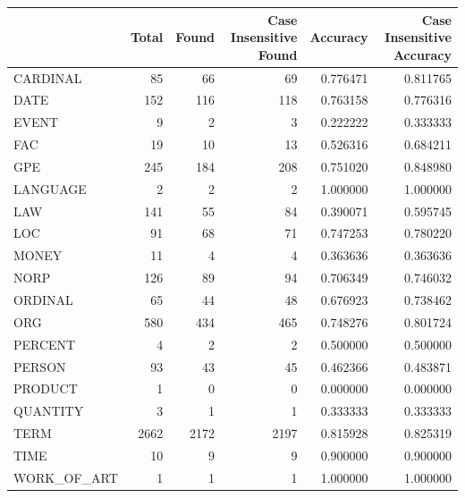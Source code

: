 \begin{tabular}{lrrrrr}
\toprule
 & Total & Found & Case Insensitive Found & Accuracy & Case Insensitive Accuracy \\
\midrule
CARDINAL & 85 & 66 & 69 & 0.776471 & 0.811765 \\
DATE & 152 & 116 & 118 & 0.763158 & 0.776316 \\
EVENT & 9 & 2 & 3 & 0.222222 & 0.333333 \\
FAC & 19 & 10 & 13 & 0.526316 & 0.684211 \\
GPE & 245 & 184 & 208 & 0.751020 & 0.848980 \\
LANGUAGE & 2 & 2 & 2 & 1.000000 & 1.000000 \\
LAW & 141 & 55 & 84 & 0.390071 & 0.595745 \\
LOC & 91 & 68 & 71 & 0.747253 & 0.780220 \\
MONEY & 11 & 4 & 4 & 0.363636 & 0.363636 \\
NORP & 126 & 89 & 94 & 0.706349 & 0.746032 \\
ORDINAL & 65 & 44 & 48 & 0.676923 & 0.738462 \\
ORG & 580 & 434 & 465 & 0.748276 & 0.801724 \\
PERCENT & 4 & 2 & 2 & 0.500000 & 0.500000 \\
PERSON & 93 & 43 & 45 & 0.462366 & 0.483871 \\
PRODUCT & 1 & 0 & 0 & 0.000000 & 0.000000 \\
QUANTITY & 3 & 1 & 1 & 0.333333 & 0.333333 \\
TERM & 2662 & 2172 & 2197 & 0.815928 & 0.825319 \\
TIME & 10 & 9 & 9 & 0.900000 & 0.900000 \\
WORK_OF_ART & 1 & 1 & 1 & 1.000000 & 1.000000 \\
\bottomrule
\end{tabular}
